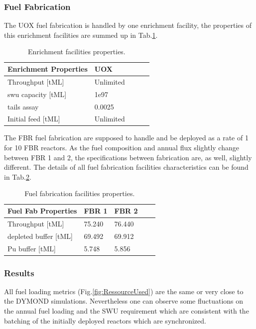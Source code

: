 \documentclass[12pt]{article}
\begin{document}
\subsubsection{Fuel Fabrication}
The UOX fuel fabrication is handled by one
enrichment facility, the properties of this
enrichment facilities are summed up in
Tab.\ref{tab:enrich_1}.

\begin{table}[h!]
\centering
\begin{tabular}{lllll}
\hline
Enrichment Properties	&	UOX		\\
\hline
Throughput [tML]		&	Unlimited	\\
swu capacity [tML]		&	1e97		\\
tails assay  			&	0.0025	\\
Initial feed [tML]		&	Unlimited	\\
\hline
\end{tabular}
\caption{Enrichment facilities properties. }
\label{tab:enrich_1}
\end{table}

The FBR fuel fabrication are supposed to handle and
be deployed as a rate of 1 for 10 FBR reactors.
As the fuel composition and annual flux
slightly change between FBR 1 and 2, the
specifications between fabrication are, as well,
slightly different. The details of all fuel
fabrication facilities characteristics can be
found in Tab.\ref{tab:fuelfab_1}.

\begin{table}[h!]
\centering
\begin{tabular}{lllll}
\hline
Fuel Fab Properties	&	FBR 1	&	FBR 2	\\
\hline
Throughput [tML]	&	75.240	&	76.440	\\
depleted buffer [tML]	&	69.492	&	69.912	\\
Pu buffer  [tML]		&	5.748	&	5.856	\\
\hline
\end{tabular}
\caption{Fuel fabrication facilities properties.}
\label{tab:fuelfab_1}
\end{table}


\subsubsection{Results}
All fuel loading metrics
(Fig.\ref{fig:RessourceUsed}) are the same or very
close to the DYMOND simulations. Nevertheless one
can observe some fluctuations on the annual fuel
loading and the SWU requirement which are
consistent with the batching of the initially
deployed reactors which are synchronized.
\end{document}
